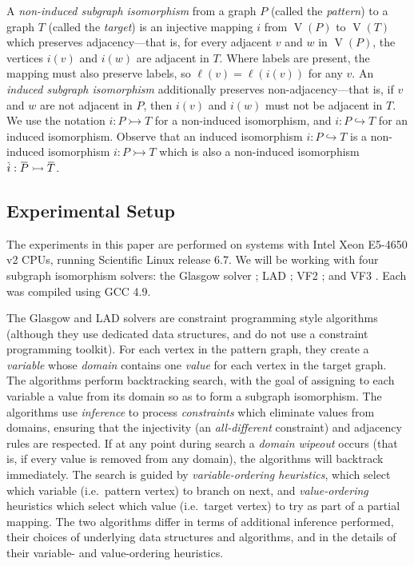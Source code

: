 \documentclass[twoside,11pt]{article}
\newcommand{\citep}[1]{\cite{#1}}
\newcommand{\shortoverline}[1]{\mkern 1.5mu\overline{\mkern-1.5mu#1\mkern-1.5mu}\mkern 1.5mu}
\begin{document}
A \emph{non-induced subgraph isomorphism} from a graph $P$ (called the \emph{pattern}) to a graph
$T$ (called the \emph{target}) is an injective mapping $i$ from $\operatorname{V}(P)$ to
$\operatorname{V}(T)$ which preserves adjacency---that is, for every adjacent $v$ and $w$ in
$\operatorname{V}(P)$, the vertices $i(v)$ and $i(w)$ are adjacent in $T$. Where labels are present,
the mapping must also preserve labels, so $\ell(v) = \ell(i(v))$ for any $v$. An \emph{induced
subgraph isomorphism} additionally preserves non-adjacency---that is, if $v$ and $w$ are not
adjacent in $P$, then $i(v)$ and $i(w)$ must not be adjacent in $T$. We use the notation $i : P
\rightarrowtail T$ for a non-induced isomorphism, and $i : P \hookrightarrow T$ for an induced
isomorphism. Observe that an induced isomorphism $i : P \hookrightarrow T$ is a non-induced
isomorphism $i : P \rightarrowtail T$ which is also a non-induced isomorphism $\shortoverline{i} :
\shortoverline{P} \rightarrowtail \shortoverline{T}$.

\subsection{Experimental Setup}

The experiments in this paper are performed on systems with Intel Xeon E5-4650 v2 CPUs, running
Scientific Linux release 6.7. We will be working with four subgraph isomorphism solvers: the Glasgow
solver \citep{DBLP:conf/cp/McCreeshP15,DBLP:conf/lion/KotthoffMS16}; LAD
\citep{DBLP:journals/ai/Solnon10}; VF2 \citep{DBLP:journals/pami/CordellaFSV04}; and VF3
\citep{DBLP:conf/gbrpr/CarlettiFSV17}. Each was compiled using GCC 4.9.

The Glasgow and LAD solvers are constraint programming style algorithms (although they use dedicated
data structures, and do not use a constraint programming toolkit). For each vertex in the pattern
graph, they create a \emph{variable} whose \emph{domain} contains one \emph{value} for each vertex
in the target graph. The algorithms perform backtracking search, with the goal of assigning to each
variable a value from its domain so as to form a subgraph isomorphism. The algorithms use
\emph{inference} to process \emph{constraints} which eliminate values from domains, ensuring that
the injectivity (an \emph{all-different} constraint) and adjacency rules are respected. If at any
point during search a \emph{domain wipeout} occurs (that is, if every value is removed from any
domain), the algorithms will backtrack immediately. The search is guided by \emph{variable-ordering
heuristics}, which select which variable (i.e.\ pattern vertex) to branch on next, and
\emph{value-ordering} heuristics which select which value (i.e.\ target vertex) to try as part of a
partial mapping. The two algorithms differ in terms of additional inference performed, their
choices of underlying data structures and algorithms, and in the details of their variable- and
value-ordering heuristics.
\end{document}
